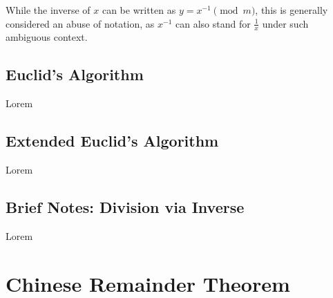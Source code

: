 While the inverse of $x$ can be written as $y = x^{-1}\pmod{m}$, this is generally considered an abuse of notation, as $x^{-1}$ can also stand for $\frac{1}{x}$ under such ambiguous context.

\subsection{Euclid's Algorithm}
Lorem

\subsection{Extended Euclid's Algorithm}
Lorem

\subsection{Brief Notes: Division via Inverse}
Lorem

\section{Chinese Remainder Theorem}
